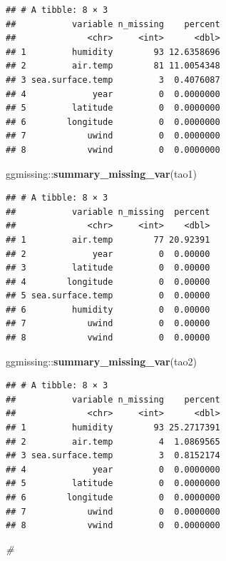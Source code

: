 \documentclass[]{article}
\newenvironment{Shaded}{\begin{snugshade}}{\end{snugshade}}
\newcommand{\KeywordTok}[1]{\textcolor[rgb]{0.13,0.29,0.53}{\textbf{{#1}}}}
\newcommand{\CommentTok}[1]{\textcolor[rgb]{0.56,0.35,0.01}{\textit{{#1}}}}
\newcommand{\NormalTok}[1]{{#1}}
\begin{document}
\begin{verbatim}
## # A tibble: 8 × 3
##           variable n_missing    percent
##              <chr>     <int>      <dbl>
## 1         humidity        93 12.6358696
## 2         air.temp        81 11.0054348
## 3 sea.surface.temp         3  0.4076087
## 4             year         0  0.0000000
## 5         latitude         0  0.0000000
## 6        longitude         0  0.0000000
## 7            uwind         0  0.0000000
## 8            vwind         0  0.0000000
\end{verbatim}

\begin{Shaded}
\begin{Highlighting}[]
\NormalTok{ggmissing::}\KeywordTok{summary_missing_var}\NormalTok{(tao1)}
\end{Highlighting}
\end{Shaded}

\begin{verbatim}
## # A tibble: 8 × 3
##           variable n_missing  percent
##              <chr>     <int>    <dbl>
## 1         air.temp        77 20.92391
## 2             year         0  0.00000
## 3         latitude         0  0.00000
## 4        longitude         0  0.00000
## 5 sea.surface.temp         0  0.00000
## 6         humidity         0  0.00000
## 7            uwind         0  0.00000
## 8            vwind         0  0.00000
\end{verbatim}

\begin{Shaded}
\begin{Highlighting}[]
\NormalTok{ggmissing::}\KeywordTok{summary_missing_var}\NormalTok{(tao2)}
\end{Highlighting}
\end{Shaded}

\begin{verbatim}
## # A tibble: 8 × 3
##           variable n_missing    percent
##              <chr>     <int>      <dbl>
## 1         humidity        93 25.2717391
## 2         air.temp         4  1.0869565
## 3 sea.surface.temp         3  0.8152174
## 4             year         0  0.0000000
## 5         latitude         0  0.0000000
## 6        longitude         0  0.0000000
## 7            uwind         0  0.0000000
## 8            vwind         0  0.0000000
\end{verbatim}

\begin{Shaded}
\begin{Highlighting}[]
\CommentTok{# }
\end{Highlighting}
\end{Shaded}
\end{document}
